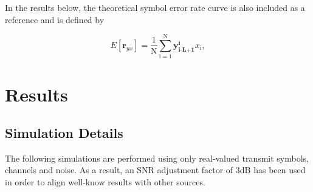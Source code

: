 \documentclass[12pt,a4paper]{report}
\begin{document}
\par
In the results below, the theoretical symbol error rate curve  is also included as a reference and is defined by 

\begin{equation*}\label{mmse}
E[\mathbf{r}_{yx}]= \frac{1}{\mathrm{N}}\sum_{\mathrm{i=1}}^{\mathrm{N}}
\mathbf{y^{\text{i}}_{\text{i-L+1}}}x_{\text{i}},
 \end{equation*}



\section{Results}

\subsection{Simulation Details}
The following simulations are performed using only real-valued transmit symbols, channels and noise. As a result, an SNR adjustment factor of 3dB has been used in order to align well-know results with other sources. 
\end{document}
